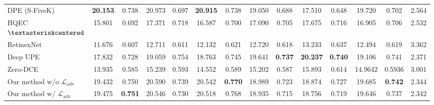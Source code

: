 \documentclass[final]{cvpr}
\begin{document}
\begin{table*}
\begin{center}
{\begin{tabular}{|l|c|c|c|c|c|c|c|c|c|c|c|c|c|}
DPE (S-FiveK) \cite{DPE} & \cellcolor[HTML]{79CC7A}\textbf{20.153} & \cellcolor[HTML]{FFCCCB}0.738 & \cellcolor[HTML]{FFCCCB}20.973 & 0.697 & \cellcolor[HTML]{79CC7A}\textbf{20.915} & 0.738 & \cellcolor[HTML]{FFCCCB}19.050 & 0.688 & 17.510 & 0.648 & \cellcolor[HTML]{FFCCCB}19.720 & 0.702  & 2.564\\
\cellcolor[HTML]{D5D5D5}HQEC \cite{HQEC} $\textasteriskcentered$& 15.801 & 0.692 & 17.371 & 0.718 & 16.587 & 0.700 & 17.090 & 0.705 & 17.675 & 0.716 & 16.905 & 0.706 & 2.532\\
\cellcolor[HTML]{D5D5D5}RetinexNet \cite{Chen2018Retinex}  & 11.676 & 0.607 & 12.711 & 0.611 & 12.132 & 0.621 & 12.720 & 0.618 & 13.233 & 0.637 & 12.494 & 0.619 & 3.362\\
\cellcolor[HTML]{D5D5D5}Deep UPE \cite{DeepUPE} & 17.832 & 0.728 & 19.059 & \cellcolor[HTML]{FFFBA3}0.754 & 18.763 & \cellcolor[HTML]{FFCCCB}0.745 & \cellcolor[HTML]{FFFBA3}19.641 & \cellcolor[HTML]{79CC7A}\textbf{0.737} & \cellcolor[HTML]{79CC7A}\textbf{20.237} & \cellcolor[HTML]{79CC7A}\textbf{0.740} & 19.106 & \cellcolor[HTML]{FFFBA3}0.741 & 2.371\\ 
\cellcolor[HTML]{D5D5D5}Zero-DCE \cite{guo2020zero}  & 13.935 & 0.585 & 15.239 & 0.593 & 14.552 & 0.589 & 15.202 & 0.587 & 15.893 & 0.614 & 14.9642 & 0.5936 & 3.001 \\
\hdashline
Our method w/o $\mathcal{L}_{\text{adv}}$ & \cellcolor[HTML]{FFCCCB}19.432 & \cellcolor[HTML]{FFFBA3}0.750 & 20.590 & \cellcolor[HTML]{FFCCCB}0.739 & \cellcolor[HTML]{FFFBA3}20.542 & \cellcolor[HTML]{79CC7A}\textbf{0.770} & 18.989 & \cellcolor[HTML]{FFCCCB}0.723 & 18.874 & \cellcolor[HTML]{FFFBA3}0.727 & 19.685 & \cellcolor[HTML]{79CC7A}\textbf{0.742} & 2.344 \\
Our method w/ $\mathcal{L}_{\text{adv}}$ & 19.475 & \cellcolor[HTML]{79CC7A}\textbf{0.751} & 20.546 & 0.730 & \cellcolor[HTML]{FFCCCB}20.518 & \cellcolor[HTML]{FFFBA3}0.768 & 18.935 & 0.715 & 18.756 & 0.719 & 19.646 & \cellcolor[HTML]{FFCCCB}0.737 &  \cellcolor[HTML]{FFCCCB}2.342\\\hline



\end{tabular}}
\end{center}
\end{table*}
\end{document}
